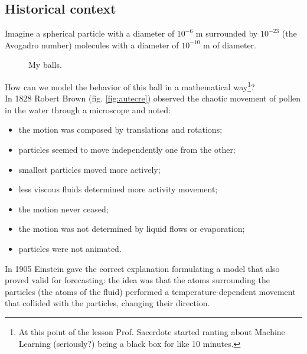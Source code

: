 \documentclass{report}
\begin{document}
\subsection{Historical context}
Imagine a spherical particle with a diameter of $10^{-6}$ m surrounded by $10^{-23}$ (the Avogadro number) molecules with a diameter of $10^{-10}$ m of diameter.
\begin{figure}[h]
	\centering
	\caption{My balls.}
	\label{fig:screenshot006}
\end{figure}
How can we model the behavior of this ball in a mathematical way\footnote{At this point of the lesson Prof. Sacerdote started ranting about Machine Learning (seriously?) being a black box for like 10 minutes.}?\\
In 1828 Robert Brown (fig. \ref{fig:autecre}) observed the chaotic movement of pollen in the water through a microscope and noted:
\begin{itemize}
	\item the motion was composed by translations and rotations;
	\item particles seemed to move independently one from the other;
	\item smallest particles moved more actively;
	\item less viscous fluids determined more activity movement;
	\item the motion never ceased;
	\item the motion was not determined by liquid flows or evaporation;
	\item particles were not animated.
\end{itemize}
In 1905 Einstein gave the correct explanation formulating a model that also proved valid for forecasting: the idea was that the atoms surrounding the particles (the atoms of the fluid) performed a temperature-dependent movement that collided with the particles, changing their direction.\\
\end{document}
